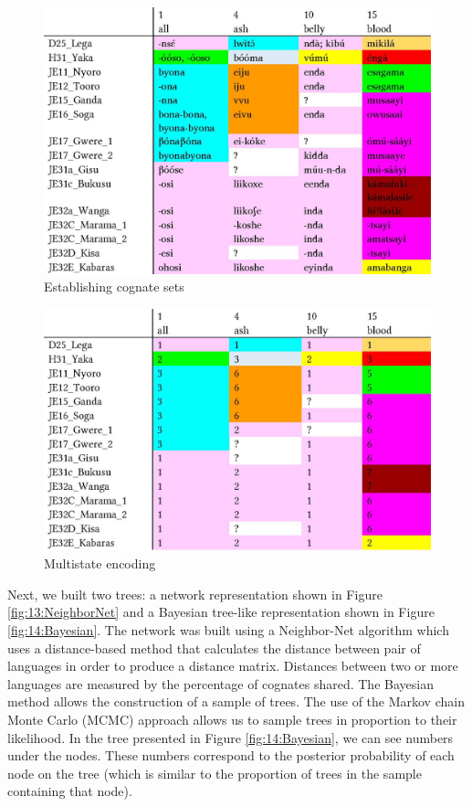 \documentclass[output=paper]{langscibook}
\begin{document}
\begin{figure}
  \caption{Establishing cognate sets}
  \label{fig:11:CognateSets}
   \includegraphics[width=\textwidth]{figures/11 Cognate sets.jpg}
\end{figure}

\begin{figure}
  \caption{Multistate encoding}
  \label{fig:9:Multistate}
   \includegraphics[width=\textwidth]{figures/12 Multistate encoding.jpg}
\end{figure}

Next, we built two trees: a network representation shown in Figure \ref{fig:13:NeighborNet} and a Bayesian tree-like representation shown in Figure \ref{fig:14:Bayesian}. The network was built using a Neighbor-Net algorithm \citep{bryant_neighbor-net:_2004} which uses a distance-based method that calculates the distance between pair of languages in order to produce a distance matrix. Distances between two or more languages are measured by the percentage of cognates shared. The Bayesian method allows the construction of a sample of trees. The use of the Markov chain Monte Carlo (MCMC) approach \citep{larget_markov_1999,pagel_phylogenetic_2004} allows us to sample trees in proportion to their likelihood. In the tree presented in Figure \ref{fig:14:Bayesian}, we can see numbers under the nodes. These numbers correspond to the posterior probability of each node on the tree (which is similar to the proportion of trees in the sample containing that node). 
\end{document}
